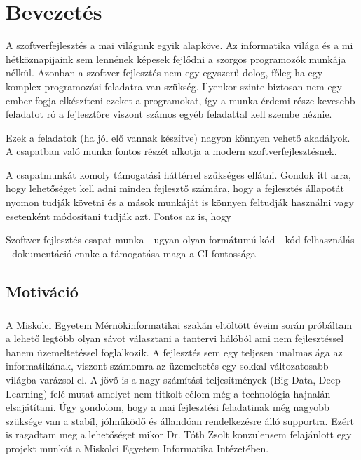 \chapter{Bevezetés}
\label{chapIntroduction}

A szoftverfejlesztés a mai világunk egyik alapköve. Az informatika világa és a mi hétköznapijaink sem lennének képesek fejlődni a szorgos programozók munkája nélkül. Azonban a szoftver fejlesztés nem egy egyszerű dolog, főleg ha egy komplex programozási feladatra van szükség. Ilyenkor szinte biztosan nem egy ember fogja elkészíteni ezeket a programokat, így a munka érdemi része kevesebb feladatot ró a fejlesztőre viszont számos egyéb feladattal kell szembe néznie.

Ezek a feladatok (ha jól elő vannak készítve) nagyon könnyen vehető akadályok. A csapatban való munka fontos részét alkotja a modern szoftverfejlesztésnek.

A csapatmunkát komoly támogatási háttérrel szükséges ellátni. 
Gondok itt arra, hogy lehetőséget kell adni minden fejlesztő számára, hogy a fejlesztés állapotát nyomon tudják követni és a mások munkáját is könnyen feltudják használni vagy esetenként módosítani tudják azt. 
Fontos az is, hogy 

Szoftver fejlesztés
csapat munka - ugyan olyan formátumú kód - kód felhasználás - dokumentáció
ennke a támogatása
maga a CI fontossága


\section{Motiváció}
\paragraph{}
A Miskolci Egyetem Mérnökinformatikai szakán eltöltött éveim során próbáltam a lehető legtöbb olyan sávot választani a tantervi hálóból ami nem fejlesztéssel hanem üzemeltetéssel foglalkozik. 
A fejlesztés sem egy teljesen unalmas ága az informatikának, viszont számomra az üzemeltetés egy sokkal változatosabb világba varázsol el.
A jövő is a nagy számítási teljesítmények (Big Data, Deep Learning) felé mutat amelyet nem titkolt célom még a technológia hajnalán elsajátítani. 
Úgy gondolom, hogy a mai fejlesztési feladatinak még nagyobb szüksége van a stabíl, jólműködő és állandóan rendelkezésre álló supportra. 
Ezért is ragadtam meg a lehetőséget mikor Dr. Tóth Zsolt konzulensem felajánlott egy projekt munkát a Miskolci Egyetem Informatika Intézetében. 

